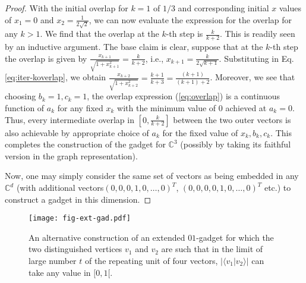 \documentclass[twocolumn, a4paper, superscriptaddress,nofootinbib, accepted=2020-08-07, hyperref]{quantumarticle}
\begin{document}
\begin{proof}
With the initial overlap for $k=1$ of $1/3$ and corresponding initial $x$ values of $x_1 = 0$ and $x_2=\frac{1}{2 \sqrt{2}}$, we can now evaluate the expression for the overlap for any $k>1$. We find that the overlap at the $k$-th step is $\frac{k}{k+2}$. This is readily seen by an inductive argument. The base claim is clear, suppose that at the $k$-th step the overlap is given by $\frac{x_{k+1}}{\sqrt{1+x_{k+1}^2}} = \frac{k}{k+2}$, i.e., $x_{k+1} = \frac{k}{2\sqrt{k+1}}$. Substituting in Eq.\ref{eq:iter-koverlap}, we obtain $\frac{x_{k+2}}{\sqrt{1+x_{k+2}^2}} = \frac{k+1}{k+3}=\frac{(k+1)}{(k+1)+2}$. Moreover, we see that choosing $b_k=1, c_k=1$, the overlap expression (\ref{eq:overlap}) is a continuous function of $a_k$ for any fixed $x_k$ with the minimum value of $0$ achieved at $a_k = 0$. Thus, every intermediate overlap in $[0,\frac{k}{k+2}]$ between the two outer vectors is also achievable by appropriate choice of $a_k$ for the fixed value of $x_k, b_k, c_k$. This completes the construction of the gadget for $\mathbb{C}^3$ (possibly by taking its faithful version in the graph representation).

Now, one may simply consider the same set of vectors as being embedded in any $\mathbb{C}^d$ (with additional vectors$(0,0,0,1,0,\dots,0)^T$, $(0,0,0,0,1,0,\dots,0)^T$ etc.) to construct a gadget in this dimension.  
\end{proof}

\begin{figure}
	\centerline{\texttt{[image: fig-ext-gad.pdf]}}
	\caption{An alternative construction of an extended $01$-gadget for which the two distinguished vertices $v_1$ and $v_2$ are such that in the limit of large number $t$ of the repeating unit of four vectors, $| \langle v_1 | v_2 \rangle|$ can take any value in $[0,1[$.}
	\label{fig:ext-gad}
\end{figure} 
\end{document}
